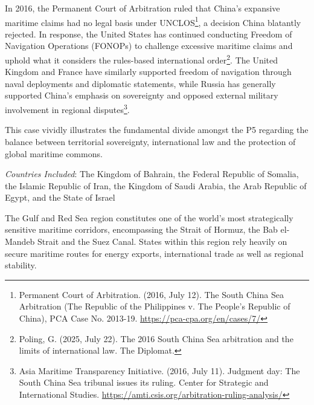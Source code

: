 In 2016, the Permanent Court of Arbitration ruled that China's expansive maritime claims had no legal basis under UNCLOS\footnote{Permanent Court of Arbitration. (2016, July 12). The South China Sea Arbitration (The Republic of the Philippines v. The People's Republic of China), PCA Case No. 2013-19. \url{https://pca-cpa.org/en/cases/7/}}, a decision China blatantly rejected. In response, the United States has continued conducting Freedom of Navigation Operations (FONOPs) to challenge excessive maritime claims and uphold what it considers the rules-based international order\footnote{Poling, G. (2025, July 22). The 2016 South China Sea arbitration and the limits of international law. The Diplomat.}. The United Kingdom and France have similarly supported freedom of navigation through naval deployments and diplomatic statements, while Russia has generally supported China's emphasis on sovereignty and opposed external military involvement in regional disputes\footnote{Asia Maritime Transparency Initiative. (2016, July 11). Judgment day: The South China Sea tribunal issues its ruling. Center for Strategic and International Studies. \url{https://amti.csis.org/arbitration-ruling-analysis/}}.

This case vividly illustrates the fundamental divide amongst the P5 regarding the balance between territorial sovereignty, international law and the protection of global maritime commons.


\emph{Countries Included}: The Kingdom of Bahrain, the Federal Republic of Somalia, the Islamic Republic of Iran, the Kingdom of Saudi Arabia, the Arab Republic of Egypt, and the State of Israel

The Gulf and Red Sea region constitutes one of the world's most strategically sensitive maritime corridors, encompassing the Strait of Hormuz, the Bab el-Mandeb Strait and the Suez Canal. States within this region rely heavily on secure maritime routes for energy exports, international trade as well as regional stability.

